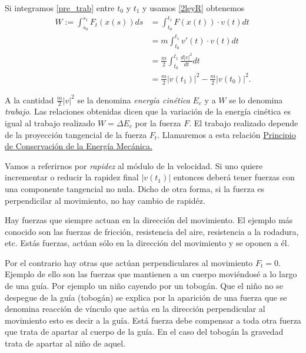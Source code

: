 Si integramos \eqref{pre_trab} entre $t_0$ y $t_1$ y usamos \eqref{2leyR} obtenemos
\begin{equation}\label{eq:trabajo}\begin{split} W:=\int_{s_0}^{s_1}F_t(x(s))ds&=\int_{t_0}^{t_1} F(x(t))\cdot v(t)dt\\
   & =m \int_{t_0}^{t_1} v'(t)\cdot v(t)dt\\
   &=\frac{m}{2} \int_{t_0}^{t_1} \frac{d|v|^2}{dt}dt\\
   &=\frac{m}{2}|v(t_1)|^2-\frac{m}{2}|v(t_0)|^2.
\end{split}
   \end{equation}



  A la cantidad $\frac{m}{2}|v|^2$ se la denomina \emph{energía cinética} $E_c$ y a $W$ se lo denomina \emph{trabajo}.
Las relaciones obtenidas dicen que la variación de la energía cinética es igual al trabajo realizado $W=\Delta E_c$ por la fuerza $F$.
El trabajo realizado depende de la proyección tangencial de la fuerza $F_t$.  Llamaremos a esta relación
\href{https://es.wikipedia.org/wiki/Conservaci%C3%B3n_de_la_energ%C3%ADa}{Principio de Conservación de la Energía Mecánica.}\link

  Vamos a referirnos por \emph{rapidez} al módulo de la velocidad.
Si uno quiere incrementar o reducir la rapidez final $|v(t_1)|$ entonces deberá tener fuerzas con una componente tangencial no nula. 
Dicho de otra forma, si la fuerza es perpendicilar al movimiento, no hay cambio de rapidéz. 

  Hay fuerzas que siempre actuan en la dirección del movimiento. El ejemplo más conocido son las fuerzas de fricción, resistencia del aire,
resistencia a la rodadura, etc. Estás fuerzas, actúan sólo en la dirección del movimiento y se oponen a él.


 

  Por el contrario hay otras que actúan perpendiculares al movimiento $F_t=0$. Ejemplo de ello son las fuerzas que mantienen a un cuerpo moviéndosé a lo largo
de una guía. Por ejemplo un niño cayendo por un tobogán. Que el niño no se despegue de la guía (tobogán) se explica por la aparición de una fuerza que se denomina
reacción de vínculo que actúa en la dirección perpendicular al movimiento esto es decir a la guía. Está fuerza debe compensar a toda otra fuerza que trata de apartar
al cuerpo de la guía.  En el caso del tobogán la gravedad trata de apartar al niño de aquel.






